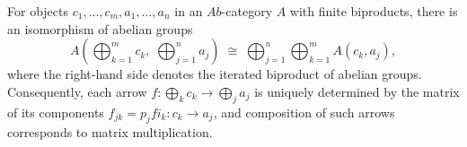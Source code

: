 For objects $c_1, \ldots, c_m, a_1, \ldots, a_n$ in an $\textit{Ab}$-category $A$ with finite biproducts, there is an isomorphism of abelian groups
$$
A\!\left( \bigoplus_{k=1}^m c_k,\; \bigoplus_{j=1}^n a_j \right) \;\cong\; \bigoplus_{j=1}^n \bigoplus_{k=1}^m A(c_k, a_j),
$$
where the right-hand side denotes the iterated biproduct of abelian groups. Consequently, each arrow $f : \bigoplus_k c_k \to \bigoplus_j a_j$ is uniquely determined by the matrix of its components $f_{jk} = p_j f i_k : c_k \to a_j$, and composition of such arrows corresponds to matrix multiplication.
